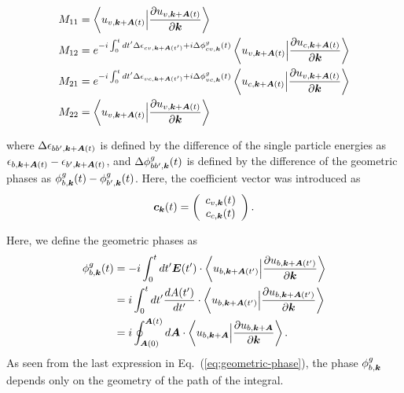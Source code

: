 \begin{align}
	 & M_{11} = \left \langle u_{v,\boldsymbol k+\boldsymbol A(t)}\Big |\frac{\partial u_{v,\boldsymbol k+\boldsymbol
	A(t)}}{\partial \boldsymbol k} \right \rangle                                                                                           \\
	 & M_{12} = e^{-i\int^t_0dt' \Delta \epsilon_{cv,\boldsymbol k+ \boldsymbol A(t')}+i \Delta \phi^g_{cv,\boldsymbol k}(t)}
	\left \langle u_{v,\boldsymbol k+\boldsymbol A(t)}\Big |\frac{\partial u_{c,\boldsymbol k+\boldsymbol A(t)}}{\partial
	\boldsymbol k} \right \rangle                                                                                                           \\
	 & M_{21} = e^{-i\int^t_0dt' \Delta \epsilon_{vc,\boldsymbol k+ \boldsymbol A(t')}+i \Delta \phi^g_{vc,\boldsymbol k}(t)}
	\left \langle u_{c,\boldsymbol k+\boldsymbol A(t)}\Big |\frac{\partial u_{v,\boldsymbol k+\boldsymbol A(t)}}{\partial
	\boldsymbol k} \right \rangle                                                                                                           \\
	 & M_{22} = \left \langle u_{v,\boldsymbol k+\boldsymbol A(t)}\Big |\frac{\partial u_{v,\boldsymbol k+\boldsymbol A(t)}}{\partial \boldsymbol k} \right \rangle
\end{align}

where $\Delta\epsilon_{bb',\boldsymbol k+ \boldsymbol A(t)}$ is defined by the difference of the single particle energies as $\epsilon_{b,\boldsymbol k+ \boldsymbol A(t)}-\epsilon_{b',\boldsymbol k+ \boldsymbol A(t)}$, and $\Delta \phi^g_{bb',\boldsymbol k}(t)$ is defined by the difference of the geometric phases as $\phi^g_{b,\boldsymbol k}(t)-\phi^g_{b',\boldsymbol k}(t)$. Here, the coefficient vector was introduced as
\begin{align}
	\boldsymbol c_{\boldsymbol k}(t) = \left(
	\begin{array}{cc}
			c_{v,\boldsymbol k}(t) \\
			c_{c,\boldsymbol k}(t)
		\end{array}
	\right).
\end{align}

Here, we define the geometric phases as
\begin{align}
	\phi^g_{b,\boldsymbol k}(t) & = -i\int^t_0 dt' \boldsymbol E(t')\cdot
	\left \langle u_{b,\boldsymbol k+\boldsymbol A(t')}\Big |\frac{\partial u_{b,\boldsymbol k+\boldsymbol A(t')}}{\partial
	\boldsymbol k} \right \rangle                                                                                                                                                                     \\
	                      & =i\int^t_0 dt' \frac{dA(t')}{dt'}\cdot
	\left \langle u_{b,\boldsymbol k+\boldsymbol A(t')}\Big |\frac{\partial u_{b,\boldsymbol k+\boldsymbol A(t')}}{\partial \boldsymbol k} \right \rangle \nonumber                                                           \\
	                      & = i \oint^{\boldsymbol A(t)}_{\boldsymbol A(0)} d\boldsymbol A \cdot \left \langle u_{b,\boldsymbol k+\boldsymbol A}\Big |\frac{\partial u_{b,\boldsymbol k+\boldsymbol A}}{\partial \boldsymbol k} \right \rangle.
	\label{eq;geometric-phase}
\end{align}
As seen from the last expression in Eq.~(\ref{eq;geometric-phase}), the phase $\phi^g_{b,\boldsymbol k}$ depends only on the geometry of the path of the integral.

